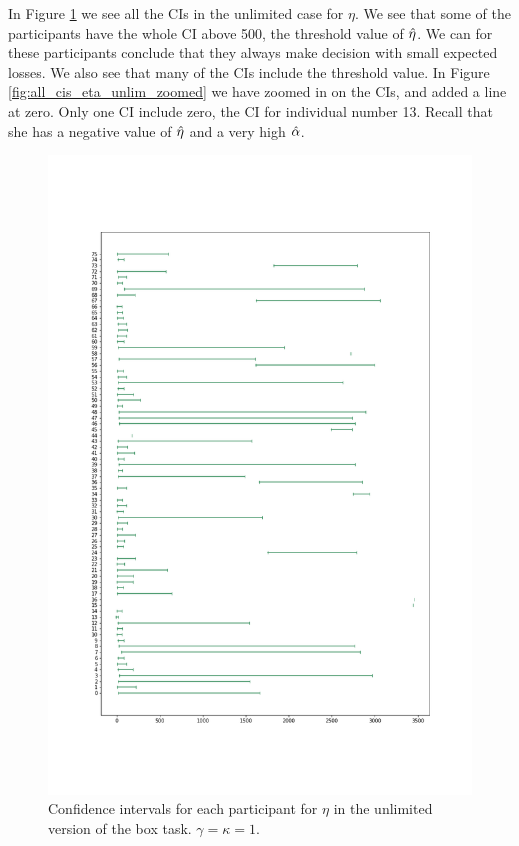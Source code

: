 


In Figure \ref{fig:all_cis_eta_unlim_v2} we see all the CIs in the unlimited case for $\eta$. We see that some of the participants have the whole CI above 500, the threshold value of $\hat{\eta}$. We can for these participants conclude that they always make decision with small expected losses. We also see that many of the CIs include the threshold value. In Figure \ref{fig:all_cis_eta_unlim_zoomed} we have zoomed in on the CIs, and added a line at zero. Only one CI include zero, the CI for individual number 13. Recall that she has a negative value of $\hat{\eta}$ and a very high $\hat{\alpha}$.
\begin{figure}
    \centering
    \includegraphics[scale=0.38]{pictures/test_cis_eta_unlim.png}
    \caption[CIs for $\eta$, unlimited. $\gamma=\kappa=1$]{Confidence intervals for each participant for $\eta$ in the unlimited version of the box task. $\gamma=\kappa=1$.}
    \label{fig:all_cis_eta_unlim_v2}
\end{figure}

